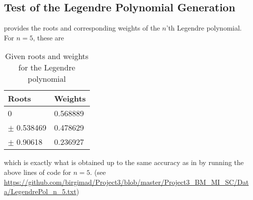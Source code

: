 \subsection{Test of the Legendre Polynomial Generation}
 provides the roots and corresponding weights of the $n$'th Legendre polynomial.
\cite{LegendrePolRootWeight} 
For $n=5$, these are 
\begin{table}[H]
\centering
\caption{Given roots and weights for the Legendre polynomial}
\begin{center}
\begin{tabular}{ | l | l | }
  \hline			
  Roots & Weights  \\
  \hline
  0 & 0.568889  \\
  \hline
  $\pm$ 0.538469 & 0.478629  \\
  \hline 
  $\pm$ 0.90618 & 0.236927 \\
  \hline 
\end{tabular}
\end{center}
\label{tab:testGLdpol}
\end{table}

which is exactly what is obtained up to the same accuracy as in  by running the above lines of code for $n=5$. (see \url{https://github.com/birgimad/Project3/blob/master/Project3_BM_MI_SC/Data/LegendrePol_n_5.txt})